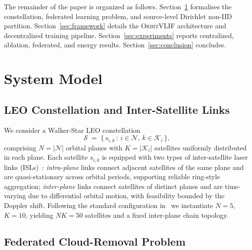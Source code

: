 \documentclass[conference]{IEEEtran}
\newcommand{\OrbitVLIF}{\textsc{OrbitVLIF}}
\begin{document}
The remainder of the paper is organized as follows.
Section~\ref{sec:sysmodel} formalises the constellation, federated
learning problem, and source-level Dirichlet non-IID partition.
Section~\ref{sec:framework} details the \OrbitVLIF{} architecture
and decentralized training pipeline. Section~\ref{sec:experiments}
reports centralized, ablation, federated, and energy
results. Section~\ref{sec:conclusion} concludes.


\section{System Model}\label{sec:sysmodel}

\subsection{LEO Constellation and Inter-Satellite Links}\label{sec:sysmodel-constellation}

We consider a Walker-Star LEO constellation
\[
\mathcal{S} \;=\; \big\{\, s_{i,k} \,:\, i \in \mathcal{N},\, k \in \mathcal{K}_i \,\big\},
\]
comprising $N \!=\! |\mathcal{N}|$ orbital planes with $K \!=\!
|\mathcal{K}_i|$ satellites uniformly distributed in each plane. Each
satellite $s_{i,k}$ is equipped with two types of inter-satellite
laser links (ISLs)~\cite{ref:flsnn}: \emph{intra-plane} links connect
adjacent satellites of the same plane and are quasi-stationary
across orbital periods, supporting reliable ring-style aggregation;
\emph{inter-plane} links connect satellites of distinct planes and
are time-varying due to differential orbital motion, with
feasibility bounded by the Doppler shift. Following the standard
configuration in~\cite{ref:flsnn} we instantiate $N \!=\! 5$, $K \!=\!
10$, yielding $NK \!=\! 50$ satellites and a fixed inter-plane
chain topology.

\subsection{Federated Cloud-Removal Problem}\label{sec:sysmodel-problem}
\end{document}
